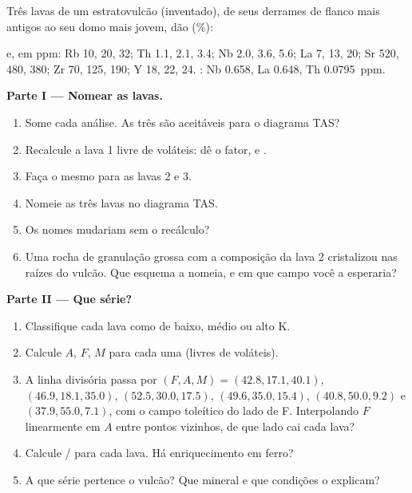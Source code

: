 \begin{problem}
\label{pb:b2:magmatic-series:1}
Três lavas de um estratovulcão (inventado), de seus derrames de flanco mais antigos ao seu domo
mais jovem, dão (\unit{\percent}):

\smallskip{}

\smallskip\noindent e, em ppm: Rb 10, 20, 32; Th 1.1, 2.1, 3.4; Nb 2.0, 3.6, 5.6;
La 7, 13, 20; Sr 520, 480, 380; Zr 70, 125, 190; Y 18, 22, 24. : Nb
0.658, La 0.648, Th \qty{0.0795}{ppm}.

\noindent\textbf{Parte I --- Nomear as lavas.}
\begin{enumerate}
\item Some cada análise. As três são aceitáveis para o diagrama TAS?
\item Recalcule a lava 1 livre de voláteis: dê o fator,  e
.
\item Faça o mesmo para as lavas 2 e 3.
\item Nomeie as três lavas no diagrama TAS.
\item Os nomes mudariam sem o recálculo?
\item Uma rocha de granulação grossa com a composição da lava 2 cristalizou nas raízes do
vulcão. Que esquema a nomeia, e em que campo você a esperaria?
\end{enumerate}

\noindent\textbf{Parte II --- Que série?}
\begin{enumerate}[resume]
\item Classifique cada lava como de baixo, médio ou alto K.
\item Calcule $A$, $F$, $M$ para cada uma (livres de voláteis).
\item A linha divisória passa por $(F, A, M) = (42.8, 17.1, 40.1)$, $(46.9, 18.1,
35.0)$, $(52.5, 30.0, 17.5)$, $(49.6, 35.0, 15.4)$, $(40.8, 50.0, 9.2)$ e $(37.9,
55.0, 7.1)$, com o campo toleítico do lado de F. Interpolando $F$ linearmente em
$A$ entre pontos vizinhos, de que lado cai cada lava?
\item Calcule / para cada lava. Há enriquecimento em ferro?
\item A que série pertence o vulcão? Que mineral e que condições
o explicam?
\end{enumerate}


\end{problem}

